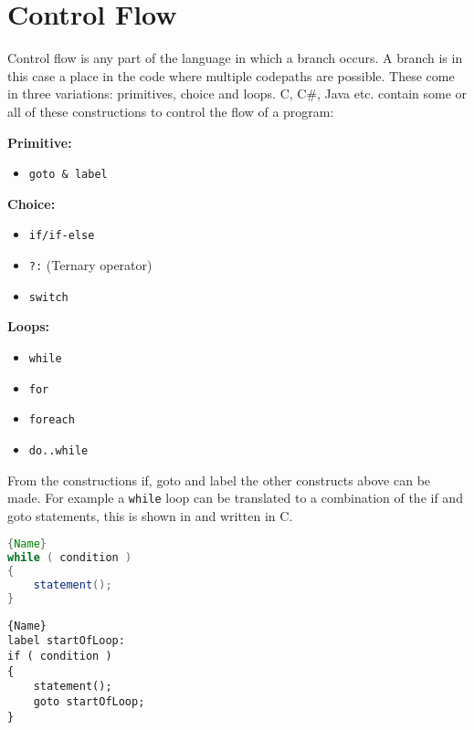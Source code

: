 \section{Control Flow}\label{subsec:control-flow}
Control flow is any part of the language in which a branch occurs. 
A branch is in this case a place in the code where multiple codepaths are possible. 
These come in three variations: primitives, choice and loops.
C, C\#, Java etc. contain some or all of these constructions to control the flow of a program:

\textbf{Primitive:}
\begin{itemize}[noitemsep,topsep=-5pt] %
    \item \texttt{goto \& label}
\end{itemize}

\textbf{Choice:}
\begin{itemize}[noitemsep,topsep=-5pt] %
    \item \texttt{if/if-else}
    \item \texttt{?:} (Ternary operator)
    \item \texttt{switch}
\end{itemize}

\textbf{Loops:}
\begin{itemize}[noitemsep,topsep=-5pt] %
    \item \texttt{while}
    \item \texttt{for}
    \item \texttt{foreach}
    \item \texttt{do..while}
\end{itemize}

From the constructions if, goto and label the other constructs above can be made.
For example a \texttt{while} loop can be translated to a combination of the if and goto statements, this is shown in  and  written in C. 

\noindent\begin{minipage}{.45\textwidth}
\begin{lstlisting}[language=java,caption=Loop made with while.,frame=tlrb, label=ifgotowhile1, numbers=none]{Name}
while ( condition )
{
    statement();
}
\end{lstlisting}
\end{minipage}\hfill
\begin{minipage}{.45\textwidth}
\begin{lstlisting}[caption=The same loop with if and goto.,frame=tlrb, label=ifgotowhile2, numbers=none]{Name}
label startOfLoop:
if ( condition )
{
    statement();
    goto startOfLoop;
}
\end{lstlisting}
\end{minipage}

